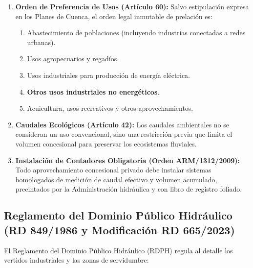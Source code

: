 \documentclass{report}
\begin{document}
\begin{enumerate}

    \item \textbf{Orden de Preferencia de Usos (Artículo 60):} Salvo estipulación expresa en los Planes de Cuenca, el orden legal inmutable de prelación es:

          \begin{enumerate}[label=\arabic*.]

              \item Abastecimiento de poblaciones (incluyendo industrias conectadas a redes urbanas).

              \item Usos agropecuarios y regadíos.

              \item Usos industriales para producción de energía eléctrica.

              \item \textbf{Otros usos industriales no energéticos}.

              \item Acuicultura, usos recreativos y otros aprovechamientos.

          \end{enumerate}

    \item \textbf{Caudales Ecológicos (Artículo 42):} Los caudales ambientales no se consideran un uso convencional, sino una restricción previa que limita el volumen concesional para preservar los ecosistemas fluviales.

    \item \textbf{Instalación de Contadores Obligatoria (Orden ARM/1312/2009):} Todo aprovechamiento concesional privado debe instalar sistemas homologados de medición de caudal efectivo y volumen acumulado, precintados por la Administración hidráulica y con libro de registro foliado.

\end{enumerate}



\subsection{Reglamento del Dominio Público Hidráulico (RD 849/1986 y Modificación RD 665/2023)}

El Reglamento del Dominio Público Hidráulico (RDPH) regula al detalle los vertidos industriales y las zonas de servidumbre:
\end{document}

